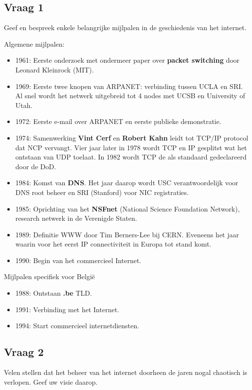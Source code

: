\documentclass[../main.tex]{subfiles}
\begin{document}
\subsection{Vraag 1}
\begin{question}
Geef en bespreek enkele belangrijke mijlpalen in de geschiedenis van het internet.
\end{question}

\begin{solution}
Algemene mijlpalen:
\begin{itemize}
	\item 1961: Eerste onderzoek met ondermeer paper over \textbf{packet switching} door Leonard Kleinrock (MIT).
	\item 1969: Eerste twee knopen van ARPANET: verbinding tussen UCLA en SRI. Al snel wordt het netwerk uitgebreid tot 4 nodes met UCSB en University of Utah.
	\item 1972: Eerste e-mail over ARPANET en eerste publieke demonstratie.
	\item 1974: Samenwerking \textbf{Vint Cerf} en \textbf{Robert Kahn} leidt tot TCP/IP protocol dat NCP vervangt. Vier jaar later in 1978 wordt TCP en IP gesplitst wat het ontstaan van UDP toelaat. In 1982 wordt TCP de als standaard gedeclareerd door de DoD.
	\item 1984: Komst van \textbf{DNS}. Het jaar daarop wordt USC verantwoordelijk voor DNS root beheer en SRI (Stanford) voor NIC registraties.
	\item 1985: Oprichting van het \textbf{NSFnet} (National Science Foundation Network), research netwerk in de Verenigde Staten.
	\item 1989: Definitie WWW door Tim Berners-Lee bij CERN. Eveneens het jaar waarin voor het eerst IP connectiviteit in Europa tot stand komt.
	\item 1990: Begin van het commercieel Internet.
\end{itemize}
Mijlpalen specifiek voor Belgi\"e
\begin{itemize}
	\item 1988: Ontstaan \textbf{.be} TLD.
	\item 1991: Verbinding met het Internet.
	\item 1994: Start commercieel internetdiensten.
\end{itemize}
\end{solution}


\subsection{Vraag 2}
\begin{question}
Velen stellen dat het beheer van het internet doorheen de jaren nogal chaotisch is
verlopen. Geef uw visie daarop.
\end{question}
\end{document}
